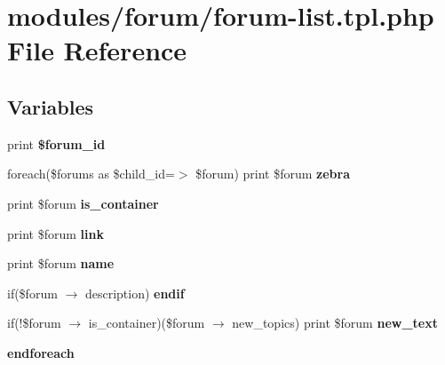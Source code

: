 \hypertarget{forum-list_8tpl_8php}{
\section{modules/forum/forum-list.tpl.php File Reference}
\label{forum-list_8tpl_8php}
}
\subsection*{Variables}
\begin{CompactItemize}
\item 
\hypertarget{forum-list_8tpl_8php_34d61fc74c18838e5ac968032b90a3f9}{
print \textbf{\$forum\_\-id}}
\label{forum-list_8tpl_8php_34d61fc74c18838e5ac968032b90a3f9}

\item 
\hypertarget{forum-list_8tpl_8php_b2afb0fd737f1a3161b83c05aa9bf0e9}{
foreach(\$forums as \$child\_\-id=$>$ \$forum) print \$forum \textbf{zebra}}
\label{forum-list_8tpl_8php_b2afb0fd737f1a3161b83c05aa9bf0e9}

\item 
\hypertarget{forum-list_8tpl_8php_efd4ad989e095c4fd5a6ffbb6c53984d}{
print \$forum \textbf{is\_\-container}}
\label{forum-list_8tpl_8php_efd4ad989e095c4fd5a6ffbb6c53984d}

\item 
\hypertarget{forum-list_8tpl_8php_96c4cb1b65109bc8e69e4fd558b76b54}{
print \$forum \textbf{link}}
\label{forum-list_8tpl_8php_96c4cb1b65109bc8e69e4fd558b76b54}

\item 
\hypertarget{forum-list_8tpl_8php_f45eed1e6416d36a59afb38dfbaed0f0}{
print \$forum \textbf{name}}
\label{forum-list_8tpl_8php_f45eed1e6416d36a59afb38dfbaed0f0}

\item 
\hypertarget{forum-list_8tpl_8php_fb799dd9a092a5f9976f8b41dc0bcd98}{
if(\$forum $\rightarrow$ description) \textbf{endif}}
\label{forum-list_8tpl_8php_fb799dd9a092a5f9976f8b41dc0bcd98}

\item 
\hypertarget{forum-list_8tpl_8php_e02958244c63e6b4c4a07e5efe312478}{
if(!\$forum $\rightarrow$ is\_\-container)(\$forum $\rightarrow$ new\_\-topics) print \$forum \textbf{new\_\-text}}
\label{forum-list_8tpl_8php_e02958244c63e6b4c4a07e5efe312478}

\item 
\hypertarget{forum-list_8tpl_8php_672d9707ef91db026c210f98cc601123}{
\textbf{endforeach}}
\label{forum-list_8tpl_8php_672d9707ef91db026c210f98cc601123}

\end{CompactItemize}


